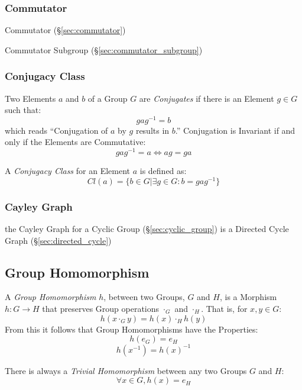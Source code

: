 \subsubsection{Commutator}\label{sec:group_commutator}

Commutator (\S\ref{sec:commutator})

Commutator Subgroup (\S\ref{sec:commutator_subgroup})



\subsubsection{Conjugacy Class}\label{sec:conjugacy_class}

Two Elements $a$ and $b$ of a Group $G$ are \emph{Conjugates} if there
is an Element $g \in G$ such that:
\[
    gag^{-1} = b
\]
which reads ``Conjugation of $a$ by $g$ results in $b$.'' Conjugation
is Invariant if and only if the Elements are Commutative:
\[
    gag^{-1} = a \Leftrightarrow ag = ga
\]

A \emph{Conjugacy Class} for an Element $a$ is defined as:
\[
    Cl(a) = \{ b \in G | \exists g \in G : b = gag^{-1}\}
\]



\subsubsection{Cayley Graph}\label{sec:cayley_graph}

the Cayley Graph for a Cyclic Group (\S\ref{sec:cyclic_group}) is a
Directed Cycle Graph (\S\ref{sec:directed_cycle})



\subsection{Group Homomorphism}\label{sec:group_homomorphism}

A \emph{Group Homomorphism} $h$, between two Groups, $G$ and $H$, is a
Morphism $h : G \rightarrow H$ that preserves Group operations
$\cdot_G$ and $\cdot_H$. That is, for $x,y \in G$:
\[
    h(x \cdot_G y) = h(x) \cdot_H h(y)
\]
From this it follows that Group Homomorphisms have the Properties:
\[
    h(e_G) = e_H
\]\[
    h(x^{-1}) = h(x)^{-1}
\]

There is always a \emph{Trivial Homomorphism} between any two Groups
$G$ and $H$:
\[
    \forall x \in G, h (x) = e_H
\]

